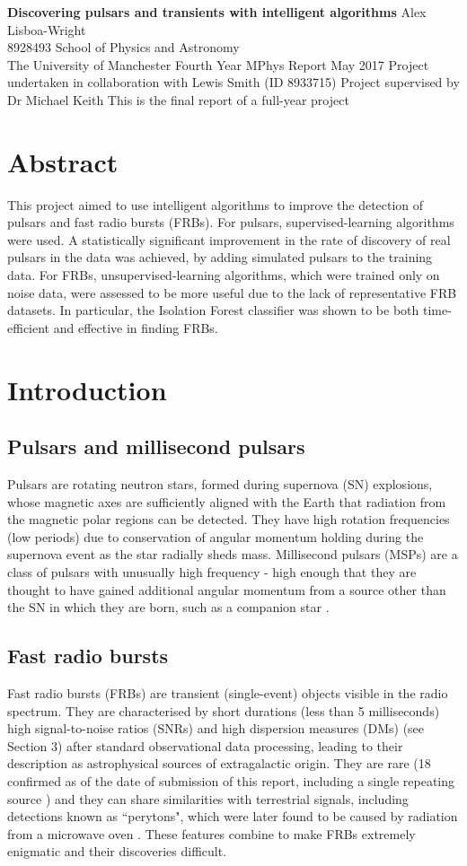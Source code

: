 \documentclass[12pt]{article}
\newcommand{\makecover}[9]{
\thispagestyle{empty}
\setcounter{page}{0}
\begin{center}\LARGE{\bf #1}\vskip 24pt \normalsize{#2}\hspace*{\fill}\\
#3\vskip 12pt School of Physics and Astronomy\\The University of Manchester\vskip 12pt #4 Year MPhys Report\vskip 12pt
#5 \vskip 12pt
#6 \vskip 12pt
#7 \vskip 12pt
#8 \end{center}\section*{Abstract}

#9\newpage}
\begin{document}

\makecover
{Discovering pulsars and transients with intelligent algorithms}
{Alex Lisboa-Wright}
{8928493}
{Fourth}
{May 2017}
{Project undertaken in collaboration with Lewis Smith (ID 8933715)}
{Project supervised by Dr Michael Keith}
{This is the final report of a full-year project}
{This project aimed to use intelligent algorithms to improve the detection of pulsars and fast radio bursts (FRBs). For pulsars, supervised-learning algorithms were used. A statistically significant improvement in the rate of discovery of real pulsars in the data was achieved, by adding simulated pulsars to the training data. For FRBs, unsupervised-learning algorithms, which were trained only on noise data, were assessed to be more useful due to the lack of representative FRB datasets. In particular, the Isolation Forest classifier was shown to be both time-efficient and effective in finding FRBs.}
\par

\section{Introduction}
\subsection{Pulsars and millisecond pulsars}
Pulsars are rotating neutron stars, formed during supernova (SN) explosions, whose magnetic axes are sufficiently aligned with the Earth that radiation from the magnetic polar regions can be detected. They have high rotation frequencies (low periods) due to conservation of angular momentum holding during the supernova event as the star radially sheds mass. Millisecond pulsars (MSPs) are a class of pulsars with unusually high frequency - high enough that they are thought to have gained additional angular momentum from a source other than the SN in which they are born, such as a companion star \cite{lorimer2008binary}.

\subsection{Fast radio bursts}
Fast radio bursts (FRBs) are transient (single-event) objects visible in the radio spectrum. They are characterised by short durations (less than 5 milliseconds) high signal-to-noise ratios (SNRs) and high dispersion measures (DMs) (see Section 3) after standard observational data processing, leading to their description as astrophysical sources of extragalactic origin. They are rare (18 confirmed as of the date of submission of this report, including a single repeating source \cite{scholz2016repeating}) and they can share similarities with terrestrial signals, including detections known as ``perytons", which were later found to be caused by radiation from a microwave oven \cite{petroff2015identifying}. These features combine to make FRBs extremely enigmatic and their discoveries difficult.
\end{document}
